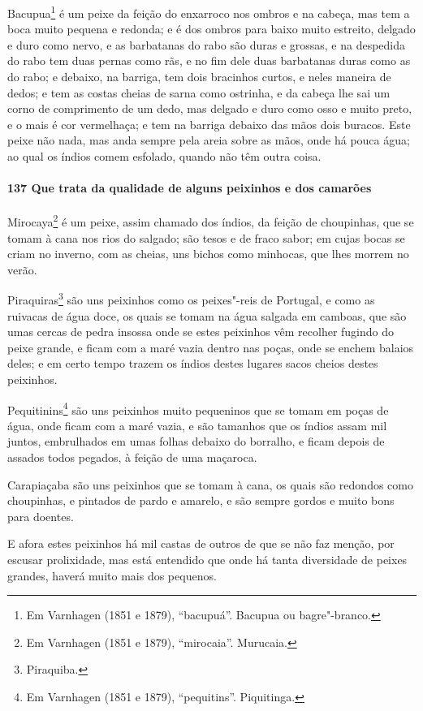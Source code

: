 Bacupua\footnote{ Em Varnhagen (1851 e 1879), ``bacupuá''. Bacupua ou bagre"-branco.} é um
peixe da feição do enxarroco nos ombros e na cabeça, mas tem a boca muito pequena e
redonda; e é dos ombros para baixo muito estreito, delgado e duro como nervo, e as
barbatanas do rabo são duras e grossas, e na despedida do rabo tem duas pernas como rãs, e
no fim dele duas barbatanas duras como as do rabo; e debaixo, na barriga, tem dois
bracinhos curtos, e neles maneira de dedos; e tem as costas cheias de sarna como ostrinha,
e da cabeça lhe sai um corno de comprimento de um dedo, mas delgado e duro como osso e
muito preto, e o mais é cor vermelhaça; e tem na barriga debaixo das mãos dois buracos.
Este peixe não nada, mas anda sempre pela areia sobre as mãos, onde há pouca água; ao qual
os índios comem esfolado, quando não têm outra coisa.

\paragraph{137 Que trata da qualidade de alguns peixinhos e dos camarões}

Mirocaya\footnote{ Em Varnhagen (1851 e 1879), ``mirocaia''. Murucaia.} é um peixe, assim
chamado dos índios, da feição de choupinhas, que se tomam à cana nos rios do salgado; são
tesos e de fraco sabor; em cujas bocas se criam no inverno, com as cheias, uns bichos como
minhocas, que lhes morrem no verão.

Piraquiras\footnote{ Piraquiba.} são uns peixinhos como os peixes"-reis de Portugal, e como
as ruivacas de água doce, os quais se tomam na água salgada em camboas, que são umas
cercas de pedra insossa onde se estes peixinhos vêm recolher fugindo do peixe grande, e
ficam com a maré vazia dentro nas poças, onde se enchem balaios deles; e em certo tempo
trazem os índios destes lugares sacos cheios destes peixinhos.

Pequitinins\footnote{ Em Varnhagen (1851 e 1879), ``pequitins''. Piquitinga.} são uns
peixinhos muito pequeninos que se tomam em poças de água, onde ficam com a maré vazia, e
são tamanhos que os índios assam mil juntos, embrulhados em umas folhas debaixo do
borralho, e ficam depois de assados todos pegados, à feição de uma maçaroca.

Carapiaçaba são uns peixinhos que se tomam à cana, os quais são redondos como choupinhas,
e pintados de pardo e amarelo, e são sempre gordos e muito bons para doentes.

E afora estes peixinhos há mil castas de outros de que se não faz menção, por escusar
prolixidade, mas está entendido que onde há tanta diversidade de peixes grandes, haverá
muito mais dos pequenos.

